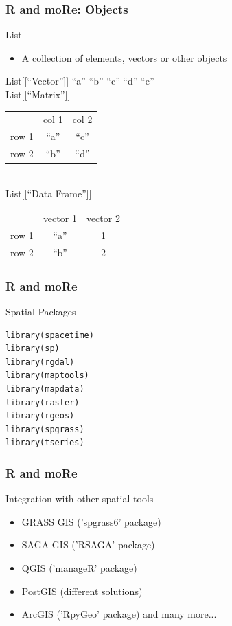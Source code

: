 \documentclass{beamer}
\begin{document}

\begin{frame}
\frametitle{R and moRe: Objects}
\begin{block}{List}
\begin{itemize}
\item A collection of elements, vectors or other objects
\end{itemize}
List[[``Vector'']] \alert{``a'' ``b'' ``c'' ``d'' ``e''}\\
List[[``Matrix'']]\\
\begin{tabular} {c c c}
 & \alert{col 1} & \alert{col 2}\\
\alert{row 1} & \alert{``a''} & \alert{``c''}\\
\alert{row 2} & \alert{``b''} & \alert{``d''}\\
\end{tabular}\\
List[[``Data Frame'']]\\
\begin{tabular} {c c c}
 & \alert{vector 1} & \alert{vector 2}\\
\alert{row 1} & \alert{``a''} & \alert{1}\\
\alert{row 2} & \alert{``b''} & \alert{2}\\
\end{tabular}
\end{block}
\end{frame}


\begin{frame}[fragile]
\frametitle{R and moRe}
\begin{exampleblock}{Spatial Packages}
\begin{verbatim}
library(spacetime)
library(sp)
library(rgdal)
library(maptools)
library(mapdata)
library(raster)
library(rgeos)
library(spgrass)
library(tseries)
\end{verbatim}
\end{exampleblock}
\end{frame}


\begin{frame}
\frametitle{R and moRe}
\begin{block}{Integration with other spatial tools}
\begin{itemize}
\item GRASS GIS ('spgrass6' package)
\item SAGA GIS ('RSAGA' package)
\item QGIS ('manageR' package)
\item PostGIS (different solutions)
\item ArcGIS ('RpyGeo' package)
and many more...
\end{itemize}
\end{block}
\end{frame}
\end{document}
